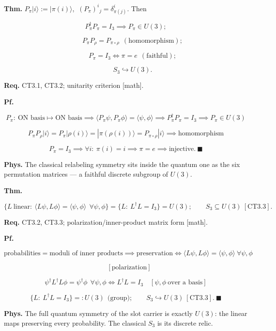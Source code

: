 \begin{theorem}\label{tag:CT3-3}
\textbf{Thm.} $P_\pi|i\rangle:=|\pi(i)\rangle$, $\ (P_\pi)^i{}_j=\delta^i_{\pi(j)}$. Then

\[
P_\pi^\dagger P_\pi=I_3\implies P_\pi\in U(3);
\]

\[
\qquad P_\pi P_\rho=P_{\pi\circ\rho}\ \ (\text{homomorphism});
\]

\[
\qquad P_\pi=I_3\iff\pi=e\ \ (\text{faithful});
\]

\[
\qquad S_3\hookrightarrow U(3).
\]

\textbf{Req.} CT3.1, CT3.2; unitarity criterion [math].

\textbf{Pf.}

\[
P_\pi:\ \text{ON basis}\mapsto\text{ON basis}\implies\langle P_\pi\psi,P_\pi\phi\rangle=\langle\psi,\phi\rangle\implies P_\pi^\dagger P_\pi=I_3\implies P_\pi\in U(3)
\]

\[
P_\pi P_\rho|i\rangle=P_\pi|\rho(i)\rangle=|\pi(\rho(i))\rangle=P_{\pi\circ\rho}|i\rangle\implies\text{homomorphism}
\]

\[
P_\pi=I_3\implies\forall i:\ \pi(i)=i\implies\pi=e\implies\text{injective}.\ \blacksquare
\]

\textbf{Phys.} The classical relabeling symmetry sits inside the quantum one as the six permutation matrices — a faithful discrete subgroup of $U(3)$.

\end{theorem}

\begin{theorem}\label{tag:CT3-4}
\textbf{Thm.}

\[
\bigl\{L\ \text{linear}:\ \langle L\psi,L\phi\rangle=\langle\psi,\phi\rangle\ \ \forall\psi,\phi\bigr\}
=\bigl\{L:\ L^\dagger L=I_3\bigr\}=U(3);\qquad
S_3\subseteq U(3)\ [\mathrm{CT3.3}].
\]

\textbf{Req.} CT3.2, CT3.3; polarization/inner-product matrix form [math].

\textbf{Pf.}

\[
\text{probabilities}=\text{moduli of inner products}\implies\text{preservation}\iff\langle L\psi,L\phi\rangle=\langle\psi,\phi\rangle\ \forall\psi,\phi
\]

\[
\quad [\text{polarization}]
\]

\[
\psi^\dagger L^\dagger L\phi=\psi^\dagger\phi\ \ \forall\psi,\phi\iff L^\dagger L=I_3\quad[\psi,\phi\ \text{over a basis}]
\]

\[
\{L:\ L^\dagger L=I_3\}=:U(3)\ \ \text{(group)};\qquad S_3\hookrightarrow U(3)\ [\mathrm{CT3.3}].\ \blacksquare
\]

\textbf{Phys.} The full quantum symmetry of the slot carrier is exactly $U(3)$: the linear maps preserving every probability. The classical $S_3$ is its discrete relic.

\end{theorem}

